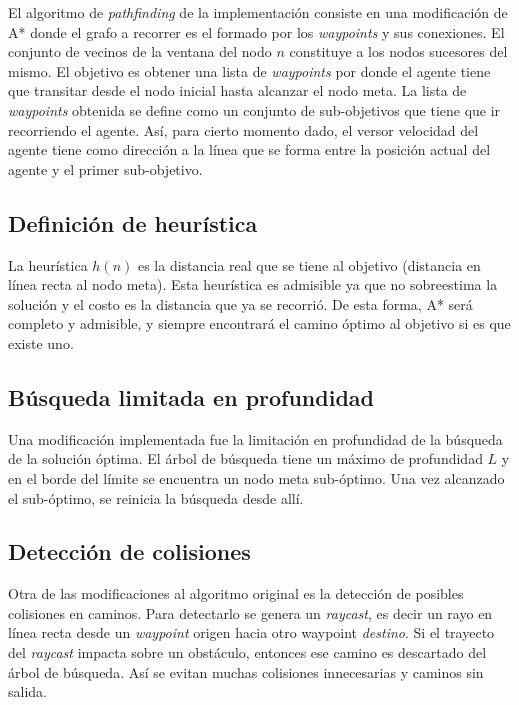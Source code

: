 \documentclass[a4paper,10pt]{article}
\begin{document}
El algoritmo de \textit{pathfinding} de la implementación consiste en una modificación de A* donde el grafo a recorrer es el formado por los \textit{waypoints} y sus conexiones. El conjunto de vecinos de la ventana del nodo $n$ constituye a los nodos sucesores del mismo. El objetivo es obtener una lista de \textit{waypoints} por donde el agente tiene que transitar desde el nodo inicial hasta alcanzar el nodo meta. La lista de \textit{waypoints} obtenida se define como un conjunto de sub-objetivos que tiene que ir recorriendo el agente. Así, para cierto momento dado, el versor velocidad del agente tiene como dirección a la línea que se forma entre la posición actual del agente y el primer sub-objetivo.


\subsection{Definición de heurística}

La heurística $h(n)$ es la distancia real que se tiene al objetivo (distancia en línea recta al nodo meta). Esta heurística es admisible ya que no sobreestima la solución y el costo es la distancia que ya se recorrió. De esta forma, A* será completo y admisible, y siempre encontrará el camino óptimo al objetivo si es que existe uno.

\subsection{Búsqueda limitada en profundidad}

Una modificación implementada fue la limitación en profundidad de la búsqueda de la solución óptima. El árbol de búsqueda tiene un máximo de profundidad $L$ y en el borde del límite se encuentra un nodo meta sub-óptimo. Una vez alcanzado el sub-óptimo, se reinicia la búsqueda desde allí.

\subsection{Detección de colisiones}

Otra de las modificaciones al algoritmo original es la detección de posibles colisiones en caminos. Para detectarlo se genera un \textit{raycast}, es decir un rayo en línea recta desde un \textit{waypoint} origen hacia otro waypoint \textit{destino}. Si el trayecto del \textit{raycast} impacta sobre un obstáculo, entonces ese camino es descartado del árbol de búsqueda. Así se evitan muchas colisiones innecesarias y caminos sin salida.
\end{document}

